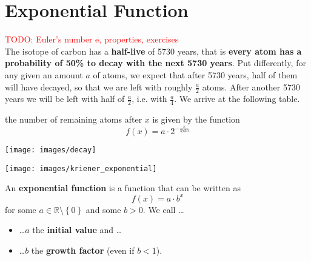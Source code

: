 \section{Exponential Function}
\textcolor{red}{TODO: Euler's number e, properties, exercises}\\
The  isotope of carbon has a \textbf{half-live} of 5730 years, that is \textbf{every  atom has a probability of 50\% to decay with the next 5730 years}.
Put differently, for any given an amount $a$ of  atoms, we expect that after 5730 years, half of them will have decayed, so that we are left with roughly $\frac{a}{2}$ atoms.
After another 5730 years we will be left with half of $\frac{a}{2}$, i.e. with $\frac{a}{4}$.
We arrive at the following table.
\begin{figure}[ht]
	\centering
\end{figure}
the number of remaining atoms after $x$ is given by the function
\begin{equation*}
	f\left(x\right)=a\cdot 2^{-\frac{x}{5730}}
\end{equation*}
\begin{minipage}{0.48\textwidth}
	\centering
	\texttt{[image: images/decay]}
\end{minipage}\hfill
\begin{minipage}{0.48\textwidth}
	\centering
	\texttt{[image: images/kriener\_exponential]}
\end{minipage}
\begin{tcolorbox}
	An \textbf{exponential function} is a function that can be written as
	\begin{equation*}
		f\left(x\right)=a\cdot b^x
	\end{equation*}
	for some $a\in\mathbb R\setminus\left\{0\right\}$ and some $b>0$.
	We call \ldots
	\begin{itemize}
		\item[] \ldots$a$ the \textbf{initial value} and \ldots
		\item[] \ldots$b$ the \textbf{growth factor} (even if $b<1$).
	\end{itemize}
\end{tcolorbox}
